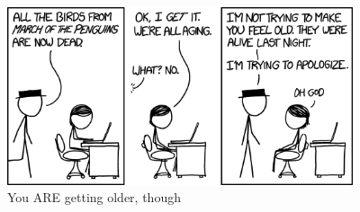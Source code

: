 \documentclass[letterpaper,12pt]{article}
\begin{document}
\begin{figure}[ht!]
	\centering
	\includegraphics[width=4in]{march_of_the_penguins.png}
    \caption*{You ARE getting older, though}
\end{figure}
\end{document}
